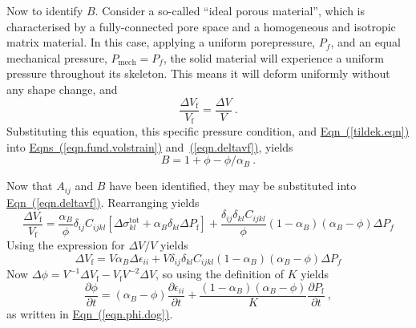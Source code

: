 \documentclass[12pt]{report}
\def\mechpressure{P_{\mathrm{mech}}}
\begin{document}
Now to identify $B$.  Consider a so-called
``ideal porous material'', which is characterised by a fully-connected
pore space and a homogeneous and isotropic matrix material.  In this
case, applying a uniform porepressure, $P_{f}$, and an equal
mechanical pressure, $\mechpressure=P_{f}$, the solid material
will experience a uniform pressure throughout its skeleton.   This
means it will deform uniformly without any shape change, and
\begin{equation}
\frac{\Delta V_{\mathrm{f}}}{V_{\mathrm{f}}} = \frac{\Delta V}{V} \ .
\end{equation}
Substituting this equation, this specific pressure condition, and
\hyperref[tildek.eqn]{Eqn~(\ref*{tildek.eqn})} into
\hyperref[eqn.fund.volstrain]{Eqns~(\ref*{eqn.fund.volstrain})}
and~\hyperref[eqn.deltavf]{(\ref*{eqn.deltavf})}, yields
\begin{equation}
B = 1 + \phi - \phi/{\alpha_{B}} \ .
\end{equation}

Now that $A_{ij}$ and $B$ have been identified, they may be
substituted into \hyperref[eqn.deltavf]{Eqn~(\ref*{eqn.deltavf})}.  Rearranging yields
\begin{equation}
\frac{\Delta V_{\mathrm{f}}}{V_{\mathrm{f}}} =
\frac{\alpha_{B}}{\phi}\delta_{ij}C_{ijkl} \left[ \Delta
\sigma_{kl}^{\mathrm{tot}} + \alpha_{B} \delta_{kl} \Delta P_{\mathrm{f}}
\right] +
\frac{\delta_{ij}\delta_{kl}C_{ijkl}}{\phi}(1-\alpha_{B})(\alpha_{B}-\phi)\Delta
P_{f}
\end{equation}
Using the expression for $\Delta V/V$ yields
\begin{equation}
\Delta V_{\mathrm{f}} = V\alpha_{B}\Delta\epsilon_{ii} +
V\delta_{ij}\delta_{kl}C_{ijkl}(1-\alpha_{B})(\alpha_{B}-\phi)\Delta P_{f}
\end{equation}
Now $\Delta\phi = V^{-1}\Delta V_{\mathrm{f}} -
V_{\mathrm{f}}V^{-2}\Delta V$, so using the definition of $K$
yields
\begin{equation}
\frac{\partial \phi}{\partial t} = (\alpha_{B} - \phi)\frac{\partial
  \epsilon_{ii}}{\partial t} + \frac{(1-\alpha_{B})(\alpha_{B} -
  \phi)}{K}\frac{\partial P_{\mathrm{f}}}{\partial t} \ ,
\end{equation}
as written in \hyperref[eqn.phi.dog]{Eqn~(\ref*{eqn.phi.dog})}.
\end{document}
